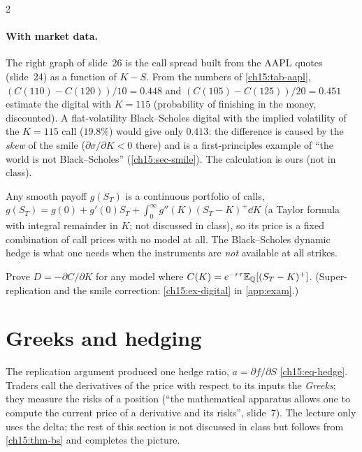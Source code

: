 \begin{paracol}{2}
\paragraph{With market data.} The right graph of slide~26 is the call spread built from the AAPL quotes (slide~24) as a function of $K-S$. From the numbers of \cref{ch15:tab-aapl}, $(C(110)-C(120))/10=0.448$
and $(C(105)-C(125))/20=0.451$ estimate the digital with $K=115$ (probability of finishing in the money, discounted). A flat-volatility Black--Scholes digital with the implied volatility of the $K=115$ call ($19.8\%$) would give only $0.413$: the
difference is caused by the \emph{skew} of the smile ($\partial\sigma/\partial K<0$ there) and is a first-principles example of ``the world is not Black--Scholes'' (\cref{ch15:sec-smile}). The calculation is ours (not in class).

\begin{intuition}
Any smooth payoff $g(S_T)$ is a continuous portfolio of calls, $g(S_T)=g(0)+g'(0)S_T+\int_0^\infty g''(K)(S_T-K)^+\dd K$ (a Taylor formula with integral remainder in $K$; not discussed in class), so its price
is a fixed combination of call prices with no model at all. The Black--Scholes dynamic hedge is what one needs when the instruments are \emph{not} available at all strikes.
\end{intuition}

\begin{exercise}\label{ch15:ex-digital-short}
Prove $D=-\partial C/\partial K$ for any model where $C(K)=e^{-r\tau}\mathbb{E}_{\mathbb{Q}}[(S_T-K)^+]$. (Super-replication and the smile correction: \cref{ch15:ex-digital} in \cref{app:exam}.)
\end{exercise}


\section{Greeks and hedging}\label{ch15:sec-greeks}
The replication argument produced one hedge ratio, $a=\partial f/\partial S$ \eqref{ch15:eq-hedge}. Traders call the derivatives of the price with respect to its inputs the \emph{Greeks}; they measure
the risks of a position (``the mathematical apparatus allows one to compute the current price of a derivative and its risks'', slide~7). The lecture only uses the delta; the rest of this section is not
discussed in class but follows from \cref{ch15:thm-bs} and completes the picture.


\end{paracol}

